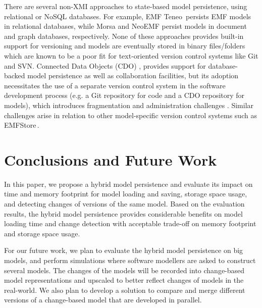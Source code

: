 \documentclass[10pt,conference]{IEEEtran}
\begin{document}
There are several non-XMI approaches to state-based model persistence, using relational or NoSQL databases. For example, EMF Teneo\,\cite{eclipse2017teneo} persists EMF models in relational databases, while Morsa \cite{DBLP:conf/models/Espinazo-PaganCM11} and NeoEMF \cite{daniel2016neoemf} persist models in document and graph databases, respectively.  None of these approaches provides built-in support for versioning and models are eventually stored in binary files/folders which are known to be a poor fit for text-oriented version control systems like Git and SVN. Connected Data Objects (CDO) \cite{eclipse2017cdo}, provides support for database-backed model persistence as well as collaboration facilities, but its adoption necessitates the use of a separate version control system in the software development process (e.g. a Git repository for code and a CDO repository for models), which introduces fragmentation and administration challenges \cite{barmpis2014evaluation}. Similar challenges arise in relation to other model-specific version control systems such as EMFStore\,\cite{koegel2010emfstore}.

\section{Conclusions and Future Work}
\label{sec:conlcusions_and_future_work}
In this paper, we propose a hybrid model persistence and evaluate its impact on time and memory footprint for model loading and saving, storage space usage, and detecting changes of versions of the same model. Based on the evaluation results, the hybrid model persistence provides considerable benefits on model loading time and change detection with acceptable trade-off on memory footprint and storage space usage.

For our future work, we plan to evaluate the hybrid model persistence on big models, and perform simulations where software modellers are asked to construct several models. The changes of the models will be recorded into change-based model representations and upscaled to better reflect changes of models in the real-world. We also plan to develop a solution to compare and merge different versions of a change-based model that are developed in parallel.  
\end{document}
